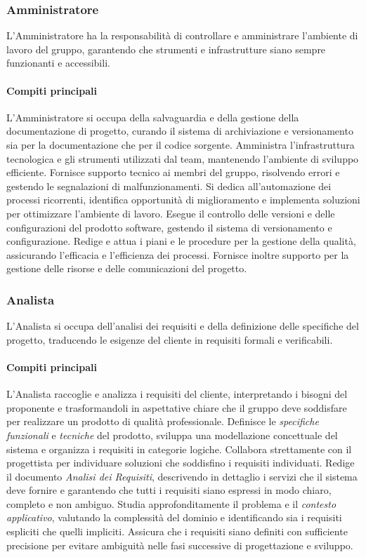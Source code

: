 \documentclass[a4paper, 11pt, oneside]{scrartcl} %
\begin{document}
\subsubsection{Amministratore}
L'Amministratore ha la responsabilità di controllare e amministrare l'ambiente di lavoro del gruppo, garantendo che strumenti e infrastrutture siano sempre funzionanti e accessibili.

\paragraph{Compiti principali}
L'Amministratore si occupa della salvaguardia e della gestione della documentazione di progetto, curando il sistema di archiviazione e versionamento sia per la documentazione che per il codice sorgente.
Amministra l'infrastruttura tecnologica e gli strumenti utilizzati dal team, mantenendo l'ambiente di sviluppo efficiente.
Fornisce supporto tecnico ai membri del gruppo, risolvendo errori e gestendo le segnalazioni di malfunzionamenti.
Si dedica all'automazione dei processi ricorrenti, identifica opportunità di miglioramento e implementa soluzioni per ottimizzare l'ambiente di lavoro.
Esegue il controllo delle versioni e delle configurazioni del prodotto software, gestendo il sistema di versionamento e configurazione.
Redige e attua i piani e le procedure per la gestione della qualità, assicurando l'efficacia e l'efficienza dei processi.
Fornisce inoltre supporto per la gestione delle risorse e delle comunicazioni del progetto.

\subsubsection{Analista}
L'Analista si occupa dell'analisi dei requisiti{\scriptsize{}} e della definizione delle specifiche del progetto, traducendo le esigenze del cliente in requisiti formali e verificabili.

\paragraph{Compiti principali}
L'Analista raccoglie e analizza i requisiti del cliente, interpretando i bisogni del proponente e trasformandoli in aspettative chiare che il gruppo deve soddisfare per realizzare un prodotto di qualità professionale.
Definisce le \emph{specifiche funzionali}{\scriptsize{}} e \emph{tecniche}{\scriptsize{}} del prodotto, sviluppa una modellazione concettuale del sistema e organizza i requisiti in categorie logiche.
Collabora strettamente con il progettista per individuare soluzioni che soddisfino i requisiti individuati.
Redige il documento \emph{Analisi dei Requisiti}{\scriptsize{}}, descrivendo in dettaglio i servizi che il sistema deve fornire e garantendo che tutti i requisiti siano espressi in modo chiaro, completo e non ambiguo.
Studia approfonditamente il problema e il \emph{contesto applicativo{\scriptsize{}}}, valutando la complessità del dominio e identificando sia i requisiti espliciti che quelli impliciti.
Assicura che i requisiti siano definiti con sufficiente precisione per evitare ambiguità nelle fasi successive di progettazione e sviluppo.
\end{document}
